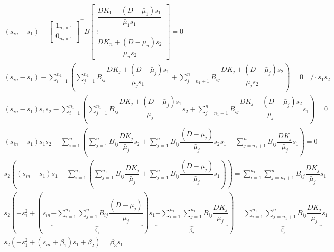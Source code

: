\documentclass[3p,times]{article}
\begin{document}
\begin{align}
(s_{in}-s_1)-	\begin{bmatrix}
1_{n_1 \times 1} \\0_{n_2\times 1}
\end{bmatrix}^\top  B\begin{bmatrix}
\dfrac{DK_1+(D-\bar{\mu}_1)s_1}{\bar{\mu}_{1}s_1} \\ \vdots \\ \dfrac{DK_n+(D-\bar{\mu}_n)s_2}{\bar{\mu}_{n}s_2} 
\end{bmatrix} = 0 \\
(s_{in}-s_1) - \sum \limits_{i=1}^{n_1}\left(\sum \limits_{j = 1}^{n_1} B_{ij}\dfrac{DK_j+(D-\bar{\mu}_j)s_1}{\bar{\mu}_{j}s_1} +\sum \limits_{j = n_1+1}^{n} B_{ij}\dfrac{DK_j+(D-\bar{\mu}_j)s_2}{\bar{\mu}_{j}s_2} \right) = 0 \quad / \cdot s_1s_2 \\
(s_{in}-s_1)s_1s_2 - \sum \limits_{i=1}^{n_1}\left(\sum \limits_{j = 1}^{n_1} B_{ij}\dfrac{DK_j+(D-\bar{\mu}_j)s_1}{\bar{\mu}_{j}}s_2 +\sum \limits_{j = n_1+1}^{n} B_{ij}\dfrac{DK_j+(D-\bar{\mu}_j)s_2}{\bar{\mu}_{j}}s_1 \right) = 0 \\
(s_{in}-s_1)s_1s_2 - \sum \limits_{i=1}^{n_1}\left(\sum \limits_{j = 1}^{n_1} B_{ij}\dfrac{DK_j}{\bar{\mu}_{j}}s_2 +\sum \limits_{j = 1}^{n} B_{ij}\dfrac{(D-\bar{\mu}_j)}{\bar{\mu}_{j}}s_2s_1 + \sum \limits_{j = n_1+1}^{n} B_{ij}\dfrac{DK_j}{\bar{\mu}_{j}}s_1 \right) = 0  \\
s_2\left((s_{in}-s_1)s_1 - \sum \limits_{i=1}^{n_1}  \left( \sum \limits_{j = 1}^{n_1} B_{ij}\dfrac{DK_j}{\bar{\mu}_{j}} + \sum \limits_{j = 1}^{n} B_{ij}\dfrac{(D-\bar{\mu}_j)}{\bar{\mu}_{j}}s_1 \right)  \right) =  \sum \limits_{i=1}^{n_1}\sum \limits_{j = n_1+1}^{n} B_{ij}\dfrac{DK_j}{\bar{\mu}_{j}}s_1 \\
s_2\left(-s_{1}^2  +  \left( s_{in}\underbrace{- \sum \limits_{i=1}^{n_1} \sum \limits_{j = 1}^{n} B_{ij}\dfrac{(D-\bar{\mu}_j)}{\bar{\mu}_{j}}}_{\beta_1}\right) s_1 \underbrace{ - \sum \limits_{i=1}^{n_1}  \sum \limits_{j = 1}^{n_1} B_{ij}\dfrac{DK_j}{\bar{\mu}_{j}}}_{\beta_2}  \right) = \underbrace{\sum \limits_{i=1}^{n_1}\sum \limits_{j = n_1+1}^{n} B_{ij}\dfrac{DK_j}{\bar{\mu}_{j}}}_{\beta_3}s_1 \\
s_2\left(-s_{1}^2  +  \left( s_{in}+\beta_1 \right) s_1 +\beta_2  \right) = \beta_3 s_1
\end{align} 
\end{document}
